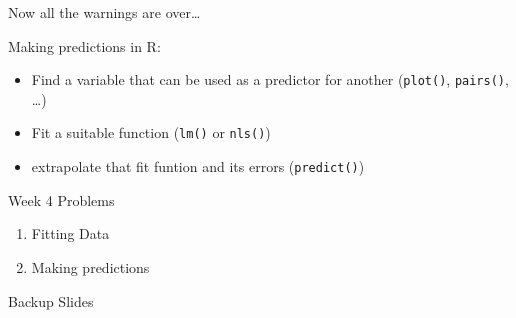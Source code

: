 \documentclass{beamer}
\begin{document}
\begin{frame}{Now all the warnings are over\ldots}

Making predictions in R:
\begin{itemize}
\item Find a variable that can be used as a predictor for another (\texttt{plot()}, \texttt{pairs()}, \ldots)
\item Fit a suitable function (\texttt{lm()} or \texttt{nls()})
\item extrapolate that fit funtion and its errors (\texttt{predict()})
\end{itemize}

\end{frame}

\begin{frame}{Week 4 Problems}

\begin{enumerate}
\item Fitting Data
\item Making predictions
\end{enumerate}



\end{frame}





\appendix
{}
\setcounter{finalframe}{\value{framenumber}}

\begin{frame}{Backup Slides}
\end{frame}




\setcounter{framenumber}{\value{finalframe}}
\end{document}
